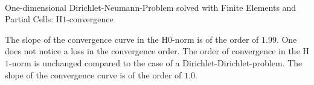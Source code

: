 \documentclass[a4paper,12pt]{article}
\makeatletter
\newenvironment{figurehere}
  {\def\@captype{figure}}
  {}
\makeatother
\begin{document}
\begin{center}
\begin{figurehere}
\\
\caption{One-dimensional Dirichlet-Neumann-Problem solved with Finite Elements and Partial Cells: H$1$-convergence}\label{fig:femneumann1dH1}
\end{figurehere}
\end{center}
The slope of the convergence curve in the H$0$-norm is of the order of $1.99$. One does not notice a loss in the convergence order. The order of convergence in the H$1$-norm is unchanged compared to the case of a Dirichlet-Dirichlet-problem.
The slope of the convergence curve is of the order of $1.0$.
\end{document}
